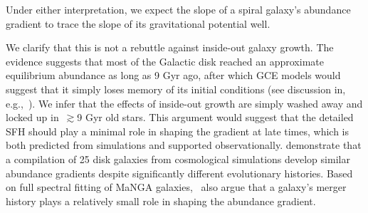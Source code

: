 Under either interpretation, we expect the slope of a spiral galaxy's
abundance gradient to trace the slope of its gravitational potential well.
\par
We clarify that this is not a rebuttle against inside-out galaxy growth.
The evidence suggests that most of the Galactic disk reached an approximate
equilibrium abundance as long as 9 Gyr ago, after which GCE models would
suggest that it simply loses memory of its initial conditions (see discussion
in, e.g.,~\citealt{Weinberg2017b}).
We infer that the effects of inside-out growth are simply washed away and
locked up in~$\gtrsim$9 Gyr old stars.
This argument would suggest that the detailed SFH should play a minimal role
in shaping the gradient at late times, which is both predicted from simulations
and supported observationally.
\citet{Pilkington2012} demonstrate that a compilation of 25 disk galaxies from
cosmological simulations develop similar abundance gradients despite
significantly different evolutionary histories.
Based on full spectral fitting of MaNGA galaxies,~\citet{Goddard2017} also
argue that a galaxy's merger history plays a relatively small role in shaping
the abundance gradient.


